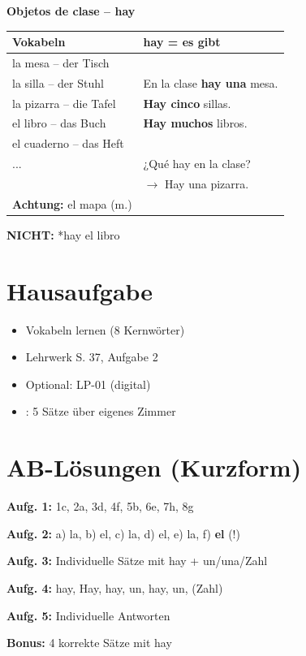 \documentclass[11pt,a4paper]{article}
\begin{document}
\begin{tcolorbox}[colback=white, colframe=grau]
\textbf{Objetos de clase -- hay}

\vspace{0.3cm}
\begin{tabular}{p{6cm}|p{6cm}}
\textbf{Vokabeln} & \textbf{hay = es gibt} \\
\hline
la mesa -- der Tisch & \\
la silla -- der Stuhl & En la clase \textbf{hay una} mesa. \\
la pizarra -- die Tafel & \textbf{Hay cinco} sillas. \\
el libro -- das Buch & \textbf{Hay muchos} libros. \\
el cuaderno -- das Heft & \\
... & ¿Qué hay en la clase? \\
& $\rightarrow$ Hay una pizarra. \\
\textbf{Achtung:} el mapa (m.) & \\
\end{tabular}

\vspace{0.3cm}
\textbf{NICHT:} *hay el libro
\end{tcolorbox}

\vspace{0.5cm}

\section*{Hausaufgabe}

\begin{itemize}[nosep]
    \item Vokabeln lernen (8 Kernwörter)
    \item Lehrwerk S. 37, Aufgabe 2
    \item Optional: LP-01 (digital)
    \item [E]: 5 Sätze über eigenes Zimmer
\end{itemize}

\vspace{0.5cm}

\section*{AB-Lösungen (Kurzform)}

\textbf{Aufg. 1:} 1c, 2a, 3d, 4f, 5b, 6e, 7h, 8g

\textbf{Aufg. 2:} a) la, b) el, c) la, d) el, e) la, f) \textbf{el} (!)

\textbf{Aufg. 3:} Individuelle Sätze mit hay + un/una/Zahl

\textbf{Aufg. 4:} hay, Hay, hay, un, hay, un, (Zahl)

\textbf{Aufg. 5:} Individuelle Antworten

\textbf{Bonus:} 4 korrekte Sätze mit hay
\end{document}
